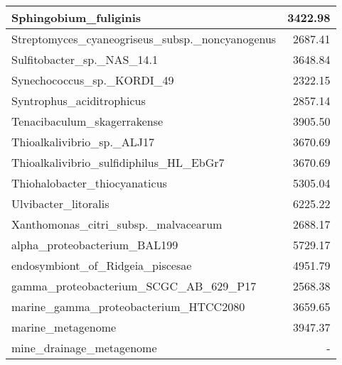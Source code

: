 \documentclass[12pt,a4paper]{article}
\begin{document}
\begin{table}[ht]
\begin{center}
\begin{tabular}{|l*{1}{|r}|}
Sphingobium\_fuliginis & 3422.98 \\ \hline
Streptomyces\_cyaneogriseus\_subsp.\_noncyanogenus & 2687.41 \\ \hline
Sulfitobacter\_sp.\_NAS\_14.1 & 3648.84 \\ \hline
Synechococcus\_sp.\_KORDI\_49 & 2322.15 \\ \hline
Syntrophus\_aciditrophicus & 2857.14 \\ \hline
Tenacibaculum\_skagerrakense & 3905.50 \\ \hline
Thioalkalivibrio\_sp.\_ALJ17 & 3670.69 \\ \hline
Thioalkalivibrio\_sulfidiphilus\_HL\_EbGr7 & 3670.69 \\ \hline
Thiohalobacter\_thiocyanaticus & 5305.04 \\ \hline
Ulvibacter\_litoralis & 6225.22 \\ \hline
Xanthomonas\_citri\_subsp.\_malvacearum & 2688.17 \\ \hline
alpha\_proteobacterium\_BAL199 & 5729.17 \\ \hline
endosymbiont\_of\_Ridgeia\_piscesae & 4951.79 \\ \hline
gamma\_proteobacterium\_SCGC\_AB\_629\_P17 & 2568.38 \\ \hline
marine\_gamma\_proteobacterium\_HTCC2080 & 3659.65 \\ \hline
marine\_metagenome & 3947.37 \\ \hline
mine\_drainage\_metagenome & - \\ \hline
\end{tabular}
\end{center}
\end{table}
\end{document}
